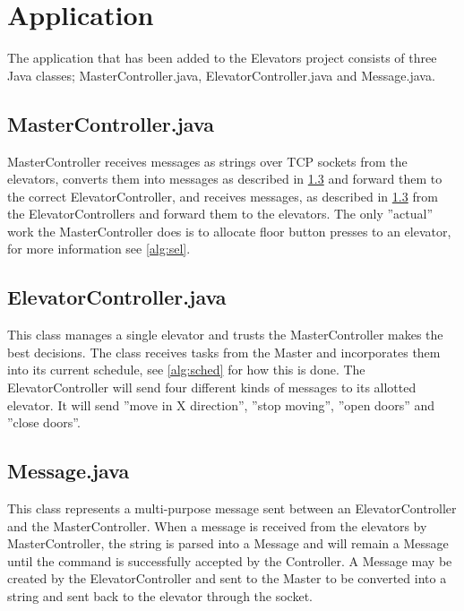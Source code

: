 \section{Application}
The application that has been added to the Elevators project consists of three Java classes; MasterController.java, ElevatorController.java and Message.java.\newline
\subsection{MasterController.java}
\label{app:master}
MasterController receives messages as strings over TCP sockets from the elevators, converts them into messages as described in \cref{app:message} and forward them to the correct ElevatorController, and receives messages, as described in \cref{app:message} from the ElevatorControllers and forward them to the elevators. The only ''actual'' work the MasterController does is to allocate floor button presses to an elevator, for more information see \cref{alg:sel}.

\subsection{ElevatorController.java}
\label{app:controller}
This class manages a single elevator and trusts the MasterController makes the best decisions. The class receives tasks from the Master and incorporates them into its current schedule, see \cref{alg:sched} for how this is done. The ElevatorController will send four different kinds of messages to its allotted elevator. It will send ''move in X direction'', ''stop moving'', ''open doors'' and ''close doors''. 

\subsection{Message.java}
\label{app:message}
This class represents a multi-purpose message sent between an ElevatorController and the MasterController. When a message is received from the elevators by MasterController, the string is parsed into a Message and will remain a Message until the command is successfully accepted by the Controller. A Message may be created by the ElevatorController and sent to the Master to be converted into a string and sent back to the elevator through the socket.